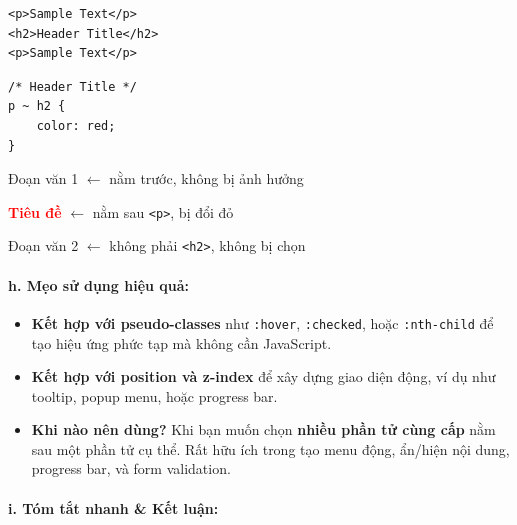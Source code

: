 \documentclass[11pt,oneside]{book}
\newcommand{\codeinline}[1]{\textcolor{accentOrange}{\texttt{#1}}}
\begin{document}
\begin{codeWindow}
\begin{lstlisting}[language=HTML5]
<p>Sample Text</p>
<h2>Header Title</h2>
<p>Sample Text</p>
\end{lstlisting}

\begin{lstlisting}[language=CSS3]
/* Header Title */
p ~ h2 {
    color: red;
}
\end{lstlisting}
\end{codeWindow}

\begin{browserWindow}
\sffamily\small
\textcolor{darkText}{Đoạn văn 1} {\small\textcolor{gray!60}{$\leftarrow$ nằm trước, không bị ảnh hưởng}} \par\vspace{2pt}
\textcolor{red}{\bfseries\large Tiêu đề} {\small\textcolor{gray!60}{$\leftarrow$ nằm sau \codeinline{<p>}, bị đổi đỏ}} \par\vspace{2pt}
\textcolor{darkText}{Đoạn văn 2} {\small\textcolor{gray!60}{$\leftarrow$ không phải \codeinline{<h2>}, không bị chọn}}
\end{browserWindow}

\paragraph{h. Mẹo sử dụng hiệu quả:}

\begin{tipBox}
\begin{itemize}[leftmargin=1.5em, itemsep=3pt, parsep=0pt]
    \item \textbf{Kết hợp với pseudo-classes} như \codeinline{:hover}, \codeinline{:checked}, hoặc \codeinline{:nth-child} để tạo hiệu ứng phức tạp mà không cần JavaScript.
    \item \textbf{Kết hợp với position và z-index} để xây dựng giao diện động, ví dụ như tooltip, popup menu, hoặc progress bar.
    \item \textbf{Khi nào nên dùng?} Khi bạn muốn chọn \textbf{nhiều phần tử cùng cấp} nằm sau một phần tử cụ thể. Rất hữu ích trong tạo menu động, ẩn/hiện nội dung, progress bar, và form validation.
\end{itemize}
\end{tipBox}

\paragraph{i. Tóm tắt nhanh \& Kết luận:}
\end{document}
